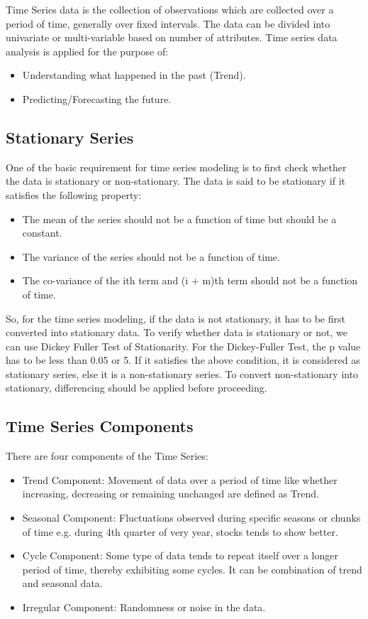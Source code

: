 \documentclass{article}
\begin{document}
Time Series data is the collection of observations which are collected over a period of time, generally over fixed intervals. The data can be divided into univariate or multi-variable based on number of attributes. Time series data analysis is applied for the purpose of:

\begin{itemize}
	\item Understanding what happened in the past (Trend).
	\item Predicting/Forecasting the future.
\end{itemize}

\subsection{Stationary Series}
One of the basic requirement for time series modeling is to first check whether the data is stationary or non-stationary. The data is said to be stationary if it satisfies the following  property:

\begin{itemize}
	\item The mean of the series should not be a function of time but should be a constant.
	\item The variance of the series should not be a function of time.
	\item The co-variance of the ith term and (i + m)th term should not be a function of time.
\end{itemize}

So, for the time series modeling, if the data is not stationary, it has to be first converted into stationary data.
To verify whether data is stationary or not, we can use Dickey Fuller Test of Stationarity.
For the Dickey-Fuller Test, the p value has to be less than 0.05 or 5.
If it satisfies the above condition, it is considered as stationary series, else it is a non-stationary series.
To convert non-stationary into stationary, differencing should be applied before proceeding.


\subsection{Time Series Components}
There are four components of the Time Series:

\begin{itemize}
	\item Trend Component:
	Movement of data over a period of time like whether increasing, decreasing or remaining unchanged are defined as Trend.
	\item Seasonal Component:
	Fluctuations observed during specific seasons or chunks of time e.g. during 4th quarter of very year, stocks tends to show better.
	\item Cycle Component:
	Some type of data tends to repeat itself over a longer period of time, thereby exhibiting some cycles. It can be combination of trend and seasonal data.
	\item Irregular Component:
	Randomness or noise in the data.
\end{itemize}	
\end{document}
